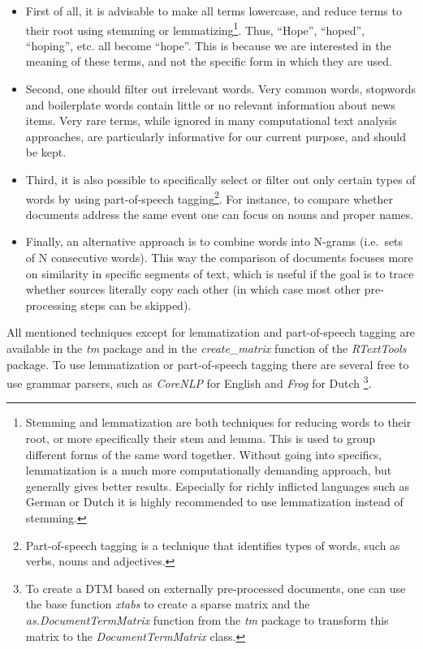 \begin{itemize}
\item
  First of all, it is advisable to make all terms lowercase, and reduce
  terms to their root using stemming or lemmatizing\footnote{Stemming
    and lemmatization are both techniques for reducing words to their
    root, or more specifically their stem and lemma. This is used to
    group different forms of the same word together. Without going into
    specifics, lemmatization is a much more computationally demanding
    approach, but generally gives better results. Especially for richly
    inflicted languages such as German or Dutch it is highly recommended
    to use lemmatization instead of stemming.}. Thus, ``Hope'',
  ``hoped'', ``hoping'', etc. all become ``hope''. This is because we
  are interested in the meaning of these terms, and not the specific
  form in which they are used.
\item
  Second, one should filter out irrelevant words. Very common words,
  stopwords and boilerplate words contain little or no relevant
  information about news items. Very rare terms, while ignored in many
  computational text analysis approaches, are particularly informative
  for our current purpose, and should be kept.
\item
  Third, it is also possible to specifically select or filter out only
  certain types of words by using part-of-speech tagging\footnote{Part-of-speech
    tagging is a technique that identifies types of words, such as
    verbs, nouns and adjectives.}. For instance, to compare whether
  documents address the same event one can focus on nouns and proper
  names.
\item
  Finally, an alternative approach is to combine words into N-grams
  (i.e.~sets of N consecutive words). This way the comparison of
  documents focuses more on similarity in specific segments of text,
  which is useful if the goal is to trace whether sources literally copy
  each other (in which case most other pre-processing steps can be
  skipped).
\end{itemize}

All mentioned techniques except for lemmatization and part-of-speech
tagging are available in the \emph{tm} package and in the
\emph{create\_matrix} function of the \emph{RTextTools} package. To use
lemmatization or part-of-speech tagging there are several free to use
grammar parsers, such as \emph{CoreNLP} for English \citep{corenlp} and
\emph{Frog} for Dutch \citep{bosch07}\footnote{To create a DTM based on
  externally pre-processed documents, one can use the base function
  \emph{xtabs} to create a sparse matrix and the
  \emph{as.DocumentTermMatrix} function from the \emph{tm} package to
  transform this matrix to the \emph{DocumentTermMatrix} class.}.


